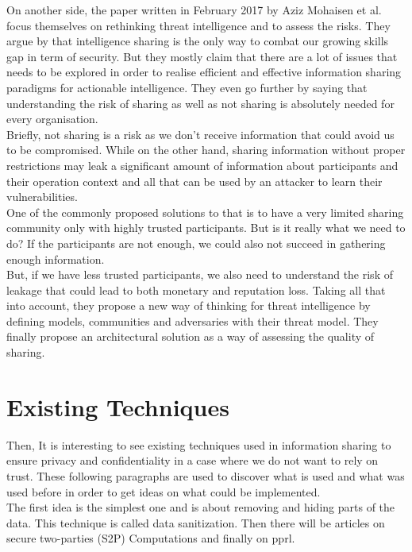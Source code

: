 \documentclass{eplmastersthesis}
\begin{document}
On another side, the paper written in February 2017 by Aziz Mohaisen et al. \cite{mohaisen2017rethinking} focus themselves on rethinking threat intelligence and to assess the risks. They argue by \cite{MalikThreat} that intelligence sharing is the only way to combat our growing skills gap in term of security. But they mostly claim that there are a lot of issues that needs to be explored in order to realise efficient and effective information sharing paradigms for actionable intelligence. They even go further by saying that understanding the risk of sharing as well as not sharing is absolutely needed for every organisation.\\
Briefly, not sharing is a risk as we don't receive information that could avoid us to be compromised. While on the other hand, sharing information without proper restrictions may leak a significant amount of information about participants and their operation context and all that can be used by an attacker to learn their vulnerabilities.\\
One of the commonly proposed solutions to that is to have a very limited sharing community only with highly trusted participants. But is it really what we need to do? If the participants are not enough, we could also not succeed in gathering enough information.\\
But, if we have less trusted participants, we also need to understand the risk of leakage that could lead to both monetary and reputation loss. Taking all that into account, they propose a new way of thinking for threat intelligence by defining models, communities and adversaries with their threat model.
They finally propose an architectural solution as a way of assessing the quality of sharing.

\section{Existing Techniques}
Then, It is interesting to see existing techniques used in information sharing to ensure privacy and confidentiality in a case where we do not want to rely on trust. These following paragraphs are used to discover what is used and what was used before in order to get ideas on what could be implemented.\\

The first idea is the simplest one and is about removing and hiding parts of the data. This technique is called data sanitization. Then there will be articles on secure two-parties (S2P) Computations and finally on \gls{pprl}.\\
\end{document}
